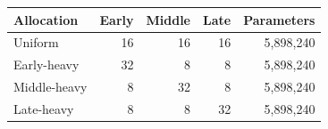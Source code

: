 \begin{tabular}{lrrrr}
\toprule
Allocation & Early & Middle & Late & Parameters \\
\midrule
Uniform & 16 & 16 & 16 & 5,898,240 \\
Early-heavy & 32 & 8 & 8 & 5,898,240 \\
Middle-heavy & 8 & 32 & 8 & 5,898,240 \\
Late-heavy & 8 & 8 & 32 & 5,898,240 \\
\bottomrule
\end{tabular}
